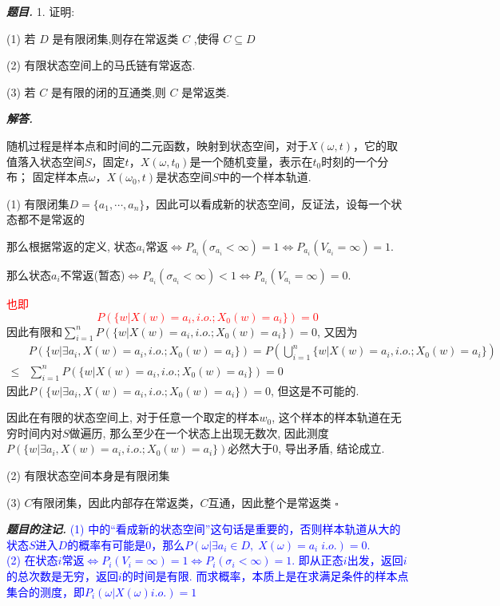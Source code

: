 \documentclass[10pt, a4paper, oneside]{ctexart}
\newenvironment{problem}{\begin{framed}\par\noindent\textbf{\textit{题目. }}}{\end{framed}\par}
\newenvironment{solution}{%
  \par\noindent\textbf{\textit{解答. }}\ignorespaces
}{%
  \hfill\ensuremath{\square}\par %
}
\newenvironment{note}{\par\noindent\textbf{\textit{题目的注记. }}\ignorespaces}{\par}
\begin{document}
\begin{problem}
    1. 证明:
    
    (1) 若 $D$ 是有限闭集,则存在常返类 $C$ ,使得 $C \subseteq D$
    
    (2) 有限状态空间上的马氏链有常返态.
    
    (3) 若 $C$ 是有限的闭的互通类,则 $C$ 是常返类.   
    \end{problem}
    \begin{solution}
    随机过程是样本点和时间的二元函数，映射到状态空间，对于$X(\omega,t)$，它的取值落入状态空间$S$，固定$t$，$X(\omega,t_0)$是一个随机变量，表示在$t_0$时刻的一个分布； 固定样本点$\omega$，$X(\omega_0,t)$是状态空间$S$中的一个样本轨道.
    
    (1) 有限闭集$D=\{a_1,\cdots,a_n\}$，因此可以看成新的状态空间，反证法，设每一个状态都不是常返的
    
    那么根据常返的定义, 状态$a_i$常返$\iff P_{a_i}(\sigma_{a_i}<\infty)=1 \iff P_{a_i}(V_{a_i}=\infty)=1$.
    
    那么状态$a_i$不常返(暂态)$\iff P_{a_i}(\sigma_{a_i}<\infty)<1\iff P_{a_i}(V_{a_i}=\infty)=0$.
    
    \textcolor{red}{也即
    $$P(\{w|X(w)=a_i, i.o. ; X_0(w)=a_i \})=0$$
    }
    因此有限和$\sum_{i=1}^{n}P(\{w|X(w)=a_i, i.o. ; X_0(w)=a_i \})=0$, 又因为 
    \begin{align*}
        &P(\{w|\exists a_i, X(w)=a_i, i.o. ; X_0(w)=a_i \})=P(\bigcup_{i=1}^{n}\{w|X(w)=a_i, i.o. ; X_0(w)=a_i \})\\\leq& \sum_{i=1}^nP(\{w|X(w)=a_i, i.o. ; X_0(w)=a_i \})=0
    \end{align*}
    因此$P(\{w|\exists a_i, X(w)=a_i, i.o. ; X_0(w)=a_i \})=0$, 但这是不可能的.
    
    因此在有限的状态空间上, 对于任意一个取定的样本$w_0$, 这个样本的样本轨道在无穷时间内对$S$做遍历, 那么至少在一个状态上出现无数次, 因此测度$P(\{w|\exists a_i, X(w)=a_i, i.o. ; X_0(w)=a_i \})$必然大于$0$, 导出矛盾, 结论成立.
    
    (2) 有限状态空间本身是有限闭集
    
    (3) $C$有限闭集，因此内部存在常返类，$C$互通，因此整个是常返类
    \end{solution}
    \begin{note}
    \textcolor{blue}{(1) 中的“看成新的状态空间”这句话是重要的，否则样本轨道从大的状态$S$进入$D$的概率有可能是$0$，那么$P(\omega| \exists a_i \in D, \; X(\omega)=a_i\; i.o.)=0$.\\(2) 在状态$i$常返$\iff P_i(V_i=\infty)=1\iff P_i(\sigma_i<\infty)=1$. 即从正态$i$出发，返回$i$的总次数是无穷，返回$i$的时间是有限. 而求概率，本质上是在求满足条件的样本点集合的测度，即$P_i(\omega|X(\omega) i.o.)=1$}
    \end{note}
    
\end{document}
